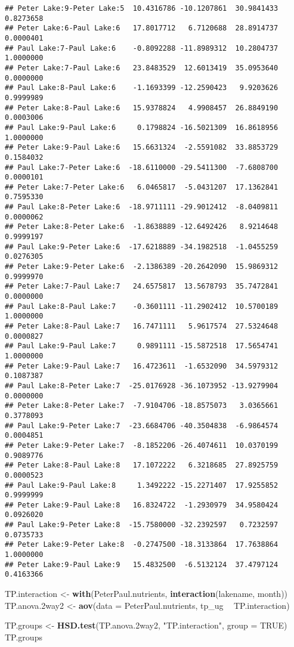 \documentclass[
]{article}
\newenvironment{Shaded}{\begin{snugshade}}{\end{snugshade}}
\newcommand{\DataTypeTok}[1]{\textcolor[rgb]{0.13,0.29,0.53}{#1}}
\newcommand{\FloatTok}[1]{\textcolor[rgb]{0.00,0.00,0.81}{#1}}
\newcommand{\KeywordTok}[1]{\textcolor[rgb]{0.13,0.29,0.53}{\textbf{#1}}}
\newcommand{\NormalTok}[1]{#1}
\newcommand{\OperatorTok}[1]{\textcolor[rgb]{0.81,0.36,0.00}{\textbf{#1}}}
\newcommand{\OtherTok}[1]{\textcolor[rgb]{0.56,0.35,0.01}{#1}}
\newcommand{\StringTok}[1]{\textcolor[rgb]{0.31,0.60,0.02}{#1}}
\begin{document}
\begin{verbatim}
## Peter Lake:9-Peter Lake:5  10.4316786 -10.1207861  30.9841433 0.8273658
## Peter Lake:6-Paul Lake:6   17.8017712   6.7120688  28.8914737 0.0000401
## Paul Lake:7-Paul Lake:6    -0.8092288 -11.8989312  10.2804737 1.0000000
## Peter Lake:7-Paul Lake:6   23.8483529  12.6013419  35.0953640 0.0000000
## Paul Lake:8-Paul Lake:6    -1.1693399 -12.2590423   9.9203626 0.9999989
## Peter Lake:8-Paul Lake:6   15.9378824   4.9908457  26.8849190 0.0003006
## Paul Lake:9-Paul Lake:6     0.1798824 -16.5021309  16.8618956 1.0000000
## Peter Lake:9-Paul Lake:6   15.6631324  -2.5591082  33.8853729 0.1584032
## Paul Lake:7-Peter Lake:6  -18.6110000 -29.5411300  -7.6808700 0.0000101
## Peter Lake:7-Peter Lake:6   6.0465817  -5.0431207  17.1362841 0.7595330
## Paul Lake:8-Peter Lake:6  -18.9711111 -29.9012412  -8.0409811 0.0000062
## Peter Lake:8-Peter Lake:6  -1.8638889 -12.6492426   8.9214648 0.9999197
## Paul Lake:9-Peter Lake:6  -17.6218889 -34.1982518  -1.0455259 0.0276305
## Peter Lake:9-Peter Lake:6  -2.1386389 -20.2642090  15.9869312 0.9999970
## Peter Lake:7-Paul Lake:7   24.6575817  13.5678793  35.7472841 0.0000000
## Paul Lake:8-Paul Lake:7    -0.3601111 -11.2902412  10.5700189 1.0000000
## Peter Lake:8-Paul Lake:7   16.7471111   5.9617574  27.5324648 0.0000827
## Paul Lake:9-Paul Lake:7     0.9891111 -15.5872518  17.5654741 1.0000000
## Peter Lake:9-Paul Lake:7   16.4723611  -1.6532090  34.5979312 0.1087387
## Paul Lake:8-Peter Lake:7  -25.0176928 -36.1073952 -13.9279904 0.0000000
## Peter Lake:8-Peter Lake:7  -7.9104706 -18.8575073   3.0365661 0.3778093
## Paul Lake:9-Peter Lake:7  -23.6684706 -40.3504838  -6.9864574 0.0004851
## Peter Lake:9-Peter Lake:7  -8.1852206 -26.4074611  10.0370199 0.9089776
## Peter Lake:8-Paul Lake:8   17.1072222   6.3218685  27.8925759 0.0000523
## Paul Lake:9-Paul Lake:8     1.3492222 -15.2271407  17.9255852 0.9999999
## Peter Lake:9-Paul Lake:8   16.8324722  -1.2930979  34.9580424 0.0926020
## Paul Lake:9-Peter Lake:8  -15.7580000 -32.2392597   0.7232597 0.0735733
## Peter Lake:9-Peter Lake:8  -0.2747500 -18.3133864  17.7638864 1.0000000
## Peter Lake:9-Paul Lake:9   15.4832500  -6.5132124  37.4797124 0.4163366
\end{verbatim}

\begin{Shaded}
\begin{Highlighting}[]
\NormalTok{TP.interaction <-}\StringTok{ }\KeywordTok{with}\NormalTok{(PeterPaul.nutrients, }\KeywordTok{interaction}\NormalTok{(lakename, month))}
\NormalTok{TP.anova}\FloatTok{.2}\NormalTok{way2 <-}\StringTok{ }\KeywordTok{aov}\NormalTok{(}\DataTypeTok{data =}\NormalTok{ PeterPaul.nutrients, tp_ug }\OperatorTok{~}\StringTok{ }\NormalTok{TP.interaction)}

\NormalTok{TP.groups <-}\StringTok{ }\KeywordTok{HSD.test}\NormalTok{(TP.anova}\FloatTok{.2}\NormalTok{way2, }\StringTok{"TP.interaction"}\NormalTok{, }\DataTypeTok{group =} \OtherTok{TRUE}\NormalTok{)}
\NormalTok{TP.groups}
\end{Highlighting}
\end{Shaded}
\end{document}
